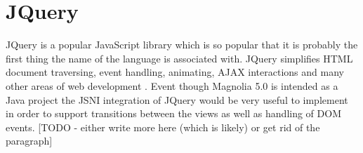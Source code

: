 \section{JQuery}
JQuery is a popular JavaScript library which is so popular that it is probably
the first thing the name of the language is associated with. JQuery simplifies
HTML document traversing, event handling, animating, AJAX interactions and many
other areas of web development \cite{jquery}. Event though Magnolia 5.0 is
intended as a Java project the JSNI integration of JQuery would be very useful
to implement in order to support transitions between the views as well as
handling of DOM events.
[TODO - either write more here (which is likely) or get rid of the paragraph]
\pagebreak
